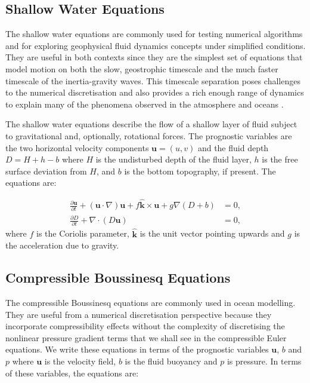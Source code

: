 \documentclass[journal abbreviation, manuscript]{copernicus}
\def\MM#1{\boldsymbol{#1}}
\newcommand{\pp}[2]{\frac{\partial #1}{\partial #2}}
\begin{document}
\subsection{Shallow Water Equations}
The shallow water equations are commonly used for testing numerical
algorithms and for exploring geophysical fluid dynamics concepts under
simplified conditions. They are useful in both contexts since they are
the simplest set of equations that model motion on both the slow,
geostrophic timescale and the much faster timescale of the
inertia-gravity waves. This timescale separation poses challenges to
the numerical discretisation and also provides a rich enough range of
dynamics to explain many of the phenomena observed in the atmosphere
and oceans \citep{zeitlin2018geophysical}.

The shallow water equations describe the flow of a shallow layer of
fluid subject to gravitational and, optionally, rotational forces. The
prognostic variables are the two horizontal velocity components
$\MM{u} = (u, v)$ and the fluid depth $D = H + h - b$ where $H$ is the
undisturbed depth of the fluid layer, $h$ is the free surface
deviation from $H$, and $b$ is the bottom topography, if present. The
equations are:

\begin{align}
  \pp{\MM{u}}{t} + (\MM{u}\cdot\nabla)\MM{u} + f\hat{\MM{k}}\times\MM{u} + g\nabla (D+b) &= 0, \\
  \pp{D}{t} + \nabla\cdot(D\MM{u}) &= 0,
\end{align}
where $f$ is the Coriolis parameter, $\hat{\MM{k}}$ is the unit vector
pointing upwards and $g$ is the acceleration due to gravity.

\subsection{Compressible Boussinesq Equations}
The compressible Boussinesq equations are commonly used in ocean
modelling. They are useful from a numerical discretisation perspective
because they incorporate compressibility effects without the
complexity of discretising the nonlinear pressure gradient terms that
we shall see in the compressible Euler equations. We write these
equations in terms of the prognostic variables $\MM{u}$, $b$ and $p$
where $\MM{u}$ is the velocity field, $b$ is the fluid buoyancy and
$p$ is pressure. In terms of these variables, the equations are:
\end{document}
